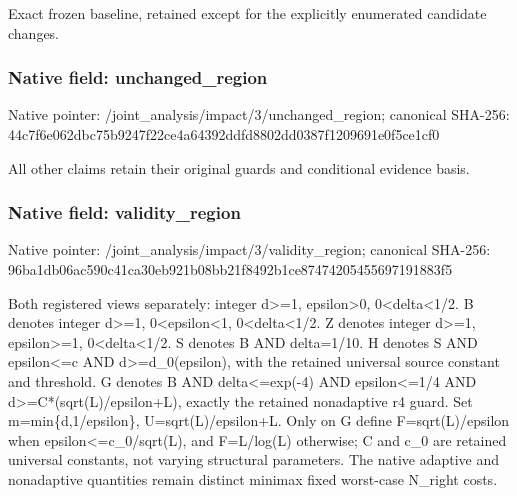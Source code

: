 \documentclass[10pt,a4paper]{article}
\begin{document}
\begingroup\raggedright\sloppy Exact frozen baseline,\allowbreak{} retained except for the explicitly enumerated candidate changes.\par\endgroup

\subsubsection{Native field: unchanged\_\allowbreak{}region}
Native pointer: /joint\_\allowbreak{}analysis/impact/3/unchanged\_\allowbreak{}region; canonical SHA-256: 44c7f6e062dbc75b9247f22ce4a64392ddfd8802dd0387f1209691e0f5ce1cf0

\begingroup\raggedright\sloppy All other claims retain their original guards and conditional evidence basis.\par\endgroup

\subsubsection{Native field: validity\_\allowbreak{}region}
Native pointer: /joint\_\allowbreak{}analysis/impact/3/validity\_\allowbreak{}region; canonical SHA-256: 96ba1db06ac590c41ca30eb921b08bb21f8492b1ce87474205455697191883f5

\begingroup\raggedright\sloppy Both registered views separately:\allowbreak{} integer d>=\allowbreak{}1,\allowbreak{} epsilon>0,\allowbreak{} 0<delta<1/\allowbreak{}2. B denotes integer d>=\allowbreak{}1,\allowbreak{} 0<epsilon<1,\allowbreak{} 0<delta<1/\allowbreak{}2. Z denotes integer d>=\allowbreak{}1,\allowbreak{} epsilon>=\allowbreak{}1,\allowbreak{} 0<delta<1/\allowbreak{}2. S denotes B AND delta=\allowbreak{}1/\allowbreak{}10. H denotes S AND epsilon<=\allowbreak{}c AND d>=\allowbreak{}d\_\allowbreak{}0(epsilon),\allowbreak{} with the retained universal source constant and threshold. G denotes B AND delta<=\allowbreak{}exp(-4) AND epsilon<=\allowbreak{}1/\allowbreak{}4 AND d>=\allowbreak{}C*(sqrt(L)/\allowbreak{}epsilon+L),\allowbreak{} exactly the retained nonadaptive r4 guard. Set m=\allowbreak{}min\{d,\allowbreak{}1/\allowbreak{}epsilon\},\allowbreak{} U=\allowbreak{}sqrt(L)/\allowbreak{}epsilon+L. Only on G define F=\allowbreak{}sqrt(L)/\allowbreak{}epsilon when epsilon<=\allowbreak{}c\_\allowbreak{}0/\allowbreak{}sqrt(L),\allowbreak{} and F=\allowbreak{}L/\allowbreak{}log(L) otherwise;\allowbreak{} C and c\_\allowbreak{}0 are retained universal constants,\allowbreak{} not varying structural parameters. The native adaptive and nonadaptive quantities remain distinct minimax fixed worst-case N\_\allowbreak{}right costs.\par\endgroup
\end{document}
